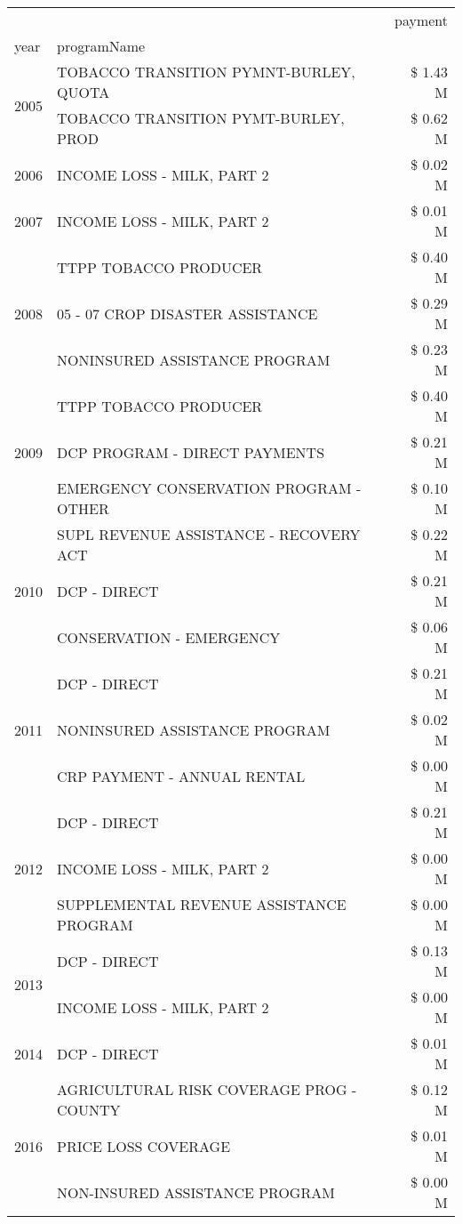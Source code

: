\begin{tabular}{llr}
\toprule
 &  & payment \\
year & programName &  \\
\midrule
\multirow[t]{2}{*}{2005} & TOBACCO TRANSITION PYMNT-BURLEY, QUOTA & \$ 1.43 M \\
 & TOBACCO TRANSITION PYMT-BURLEY, PROD & \$ 0.62 M \\
\cline{1-3}
2006 & INCOME LOSS - MILK, PART 2 & \$ 0.02 M \\
\cline{1-3}
2007 & INCOME LOSS - MILK, PART 2 & \$ 0.01 M \\
\cline{1-3}
\multirow[t]{3}{*}{2008} & TTPP TOBACCO PRODUCER & \$ 0.40 M \\
 & 05 - 07 CROP DISASTER ASSISTANCE & \$ 0.29 M \\
 & NONINSURED ASSISTANCE PROGRAM & \$ 0.23 M \\
\cline{1-3}
\multirow[t]{3}{*}{2009} & TTPP TOBACCO PRODUCER & \$ 0.40 M \\
 & DCP PROGRAM - DIRECT PAYMENTS & \$ 0.21 M \\
 & EMERGENCY CONSERVATION PROGRAM - OTHER & \$ 0.10 M \\
\cline{1-3}
\multirow[t]{3}{*}{2010} & SUPL REVENUE ASSISTANCE - RECOVERY ACT & \$ 0.22 M \\
 & DCP - DIRECT & \$ 0.21 M \\
 & CONSERVATION - EMERGENCY & \$ 0.06 M \\
\cline{1-3}
\multirow[t]{3}{*}{2011} & DCP - DIRECT & \$ 0.21 M \\
 & NONINSURED ASSISTANCE PROGRAM & \$ 0.02 M \\
 & CRP PAYMENT - ANNUAL RENTAL & \$ 0.00 M \\
\cline{1-3}
\multirow[t]{3}{*}{2012} & DCP - DIRECT & \$ 0.21 M \\
 & INCOME LOSS - MILK, PART 2 & \$ 0.00 M \\
 & SUPPLEMENTAL REVENUE ASSISTANCE PROGRAM & \$ 0.00 M \\
\cline{1-3}
\multirow[t]{2}{*}{2013} & DCP - DIRECT & \$ 0.13 M \\
 & INCOME LOSS - MILK, PART 2 & \$ 0.00 M \\
\cline{1-3}
2014 & DCP - DIRECT & \$ 0.01 M \\
\cline{1-3}
\multirow[t]{3}{*}{2016} & AGRICULTURAL RISK COVERAGE PROG - COUNTY & \$ 0.12 M \\
 & PRICE LOSS COVERAGE & \$ 0.01 M \\
 & NON-INSURED ASSISTANCE PROGRAM & \$ 0.00 M \\

\end{tabular}
